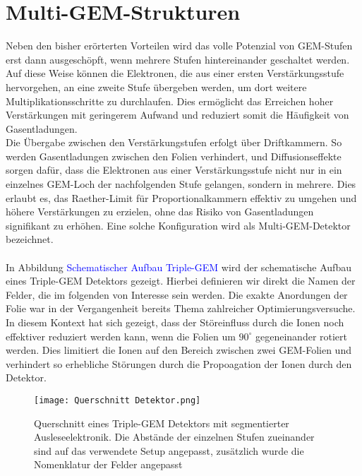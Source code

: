 \section{Multi-GEM-Strukturen}
	Neben den bisher erörterten Vorteilen wird das volle Potenzial von GEM-Stufen erst dann ausgeschöpft, wenn mehrere Stufen hintereinander geschaltet werden. Auf diese Weise können die Elektronen, die aus einer ersten Verstärkungsstufe hervorgehen, an eine zweite Stufe übergeben werden, um dort weitere Multiplikationsschritte zu durchlaufen. Dies ermöglicht das Erreichen hoher Verstärkungen mit geringerem Aufwand und reduziert somit die Häufigkeit von Gasentladungen. \\
	Die Übergabe zwischen den Verstärkungstufen erfolgt über Driftkammern. So werden Gasentladungen zwischen den Folien verhindert, und Diffusionseffekte sorgen dafür, dass die Elektronen aus einer Verstärkungsstufe nicht nur in ein einzelnes GEM-Loch der nachfolgenden Stufe gelangen, sondern in mehrere. Dies erlaubt es, das Raether-Limit für Proportionalkammern effektiv zu umgehen und höhere Verstärkungen zu erzielen, ohne das Risiko von Gasentladungen signifikant zu erhöhen. Eine solche Konfiguration wird als Multi-GEM-Detektor bezeichnet.\\
	\\
	 In Abbildung \textcolor{blue}{Schematischer Aufbau Triple-GEM} wird der schematische Aufbau eines Triple-GEM Detektors gezeigt. Hierbei definieren wir direkt die Namen der Felder, die im folgenden von Interesse sein werden. Die exakte Anordungen der Folie war in der Vergangenheit bereits Thema zahlreicher Optimierungsversuche. In diesem Kontext hat sich gezeigt, dass der Störeinfluss durch die Ionen noch effektiver reduziert werden kann, wenn die Folien um $90^{\circ}$ gegeneinander rotiert werden. Dies limitiert die Ionen auf den Bereich zwischen zwei GEM-Folien und verhindert so erhebliche Störungen durch die Propoagation der Ionen durch den Detektor.
	
	\begin{figure}[h]
		\centering
		\texttt{[image: Querschnitt Detektor.png]}
		\caption{Querschnitt eines Triple-GEM Detektors mit segmentierter Ausleseelektronik. Die Abstände der einzelnen Stufen zueinander sind auf das verwendete Setup angepasst, zusätzlich wurde die Nomenklatur der Felder angepasst}
	\end{figure}
	
	
	\newpage

